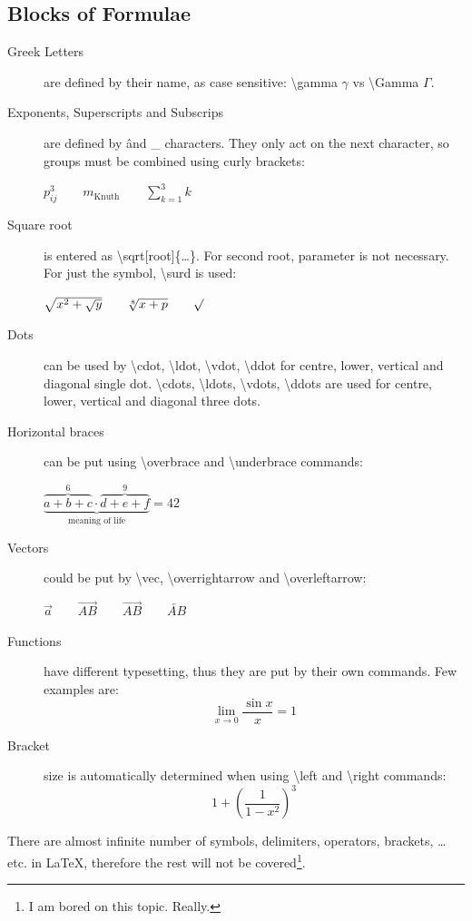 \documentclass[10pt, a4paper]{article}
\begin{document}
\subsection{Blocks of Formulae}
\begin{description}
\item[Greek Letters] are defined by their name, as case sensitive: \textbackslash gamma $\gamma$ vs \textbackslash Gamma $\Gamma$.
\item[Exponents, Superscripts and Subscrips] are defined by \^ and \_ characters. They only act on the next character, so groups must be combined using curly brackets:\\
\begin{center}
$p^3_{ij} \qquad m_\text{Knuth} \qquad \sum_{k=1}^3 k$
\end{center}
\item[Square root] is entered as \textbackslash sqrt[root]\{\ldots\}. For second root, parameter is not necessary. For just the symbol, \textbackslash surd is used:
\begin{center}
$\sqrt{x^2+\sqrt{y}} \qquad \sqrt[8]{x+p} \qquad \surd$
\end{center}
\item[Dots] can be used by \textbackslash cdot, \textbackslash ldot, \textbackslash vdot, \textbackslash ddot for centre, lower, vertical and diagonal single dot.  \textbackslash cdots, \textbackslash ldots, \textbackslash vdots, \textbackslash ddots are used for centre, lower, vertical and diagonal three dots. 
\item[Horizontal braces] can be put using \textbackslash overbrace and \textbackslash underbrace commands:
\begin{center}
$\underbrace{\overbrace{a+b+c}^6 \cdot \overbrace{d+e+f}^9}_\text{meaning of life} = 42$
\end{center}
\item[Vectors] could be put by \textbackslash vec, \textbackslash overrightarrow and \textbackslash overleftarrow:
\begin{center}
$\vec{a} \qquad \vec{AB} \qquad \overrightarrow{AB} \qquad \overleftarrow{AB}$
\end{center}
\item[Functions] have different typesetting, thus they are put by their own commands. Few examples are:
\begin{equation*}
\lim_{x \rightarrow 0}\frac{\sin x}{x} = 1
\end{equation*}
\item[Bracket] size is automatically determined when using \textbackslash left and \textbackslash right commands:
\begin{equation*}
1+\left(\frac{1}{1-x^2}\right)^3
\end{equation*}
\end{description}
There are almost infinite number of symbols, delimiters, operators, brackets, \ldots etc. in \AmS \LaTeX, therefore the rest will not be covered\footnote{I am bored on this topic. Really.}.
\end{document}
